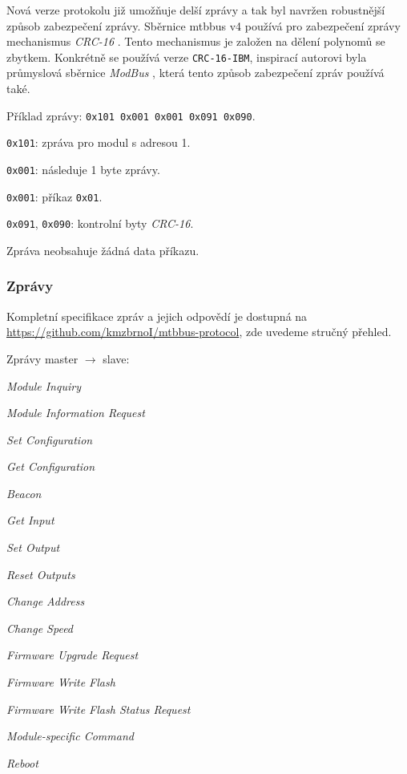 \begin{enumerate}
Nová verze protokolu již umožňuje delší zprávy a tak byl navržen robustnější
způsob zabezpečení zprávy. Sběrnice \gls{mtbbus} v4 používá pro zabezpečení
zprávy mechanismus \textit{CRC-16} \cite{crc16-modbus}. Tento mechanismus je
založen na dělení polynomů se zbytkem. Konkrétně se používá verze
\texttt{CRC-16-IBM}, inspirací autorovi byla průmyslová sběrnice \textit{ModBus}
\cite{modbus}, která tento způsob zabezpečení zpráv používá také.

\end{enumerate}

Příklad zprávy: \texttt{0x101 0x001 0x001 0x091 0x090}.

\begin{compactenum}
\item \texttt{0x101}: zpráva pro modul s adresou 1.
\item \texttt{0x001}: následuje 1 byte zprávy.
\item \texttt{0x001}: příkaz \texttt{0x01}.
\item \texttt{0x091}, \texttt{0x090}: kontrolní byty \textit{CRC-16}.
\end{compactenum}

Zpráva neobsahuje žádná data příkazu.

\subsubsection{Zprávy} \label{subsub:mtbbus-messages}

Kompletní specifikace zpráv a jejich odpovědí je dostupná na
\url{https://github.com/kmzbrnoI/mtbbus-protocol}, zde uvedeme stručný přehled.

Zprávy master $\rightarrow$ slave:

\begin{compactitem}
\item \textit{Module Inquiry}
\item \textit{Module Information Request}
\item \textit{Set Configuration}
\item \textit{Get Configuration}
\item \textit{Beacon}
\item \textit{Get Input}
\item \textit{Set Output}
\item \textit{Reset Outputs}
\item \textit{Change Address}
\item \textit{Change Speed}
\item \textit{Firmware Upgrade Request}
\item \textit{Firmware Write Flash}
\item \textit{Firmware Write Flash Status Request}
\item \textit{Module-specific Command}
\item \textit{Reboot}

\end{compactitem}

